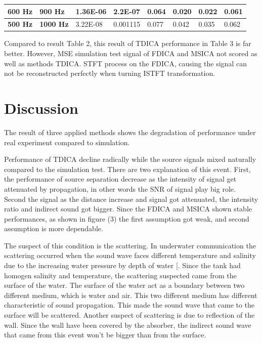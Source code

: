 \documentclass[a4paper]{jpconf}
\begin{document}
\begin{table}[b]
\begin{tabular}{|l|l|l|l|l|l|l|l|}
\textbf{600 Hz}                                          & \textbf{900 Hz}                                         & 1.36E-06                            & 2.2E-07                             & 0.064                               & 0.020                               & 0.022                               & 0.061                               \\ \hline
\textbf{500 Hz}                                          & \textbf{1000 Hz}                                        & 3.22E-08                            & 0.001115                            & 0.077                               & 0.042                               & 0.035                               & 0.062                               \\ \hline
\end{tabular}
\end{table}

Compared to result Table 2, this result of TDICA performance in Table 3 is far better. However, MSE simulation test signal of FDICA and MSICA not scored as well as methods TDICA. STFT process on the FDICA, causing the signal can not be reconstructed perfectly when turning ISTFT transformation.

\section{Discussion}
The result of three applied methods shows the degradation of performance under real experiment compared to simulation.

Performance of TDICA decline radically while the source signals mixed naturally compared to the simulation test.  There are two explanation of this event. First, the performance of source separation decrease as the intensity of signal get attenuated by propagation, in other words the SNR of signal play big role. Second the signal as the distance increase and signal got attenuated, the intensity ratio and indirect sound got bigger. Since the FDICA and MSICA shown stable performances, as shown in figure (3) the first assumption got weak, and second assumption is more dependable.

The suspect of this condition is the scattering. In underwater communication the scattering occurred when the sound wave faces different temperature and salinity due to the increasing water pressure by depth of water [. Since the tank had homogen salinity and temperature, the scattering suspected came from the surface of the water. The surface of the water act as a boundary between two different medium, which is water and air. This two different medium has different characteristic of sound propagation. This made the sound wave that came to the surface will be scattered. Another suspect of scattering is due to reflection of the wall. Since the wall have been covered by the absorber, the indirect sound wave that came from this event won’t be bigger than from the surface.
\end{document}
